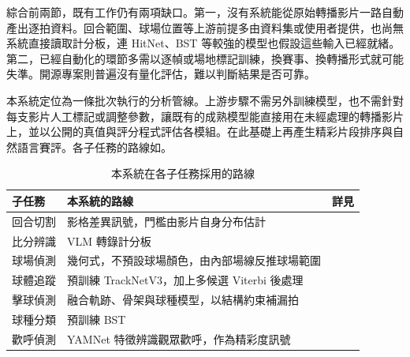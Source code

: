 綜合前兩節，既有工作仍有兩項缺口。第一，沒有系統能從原始轉播影片一路自動產出逐拍資料。回合範圍、球場位置等上游前提多由資料集或使用者提供，也尚無系統直接讀取計分板，連 HitNet、BST 等較強的模型也假設這些輸入已經就緒。第二，已經自動化的環節多需以逐幀或場地標記訓練，換賽事、換轉播形式就可能失準。開源專案則普遍沒有量化評估，難以判斷結果是否可靠。

本系統定位為一條批次執行的分析管線。上游步驟不需另外訓練模型，也不需針對每支影片人工標記或調整參數，讓既有的成熟模型能直接用在未經處理的轉播影片上，並以公開的真值與評分程式評估各模組。在此基礎上再產生精彩片段排序與自然語言賽評。各子任務的路線如。

\begin{table}[htbp]
  \centering
  \small
  \caption{本系統在各子任務採用的路線}
  \label{tab:positioning}
  \begin{tabularx}{\linewidth}{|l|L|r|}
    \hline
    {子任務} & {本系統的路線} & {詳見} \\ \hline
    回合切割 & 影格差異訊號，門檻由影片自身分布估計 &  \\ \hline
    比分辨識 & VLM 轉錄計分板 &  \\ \hline
    球場偵測 & 幾何式，不預設球場顏色，由內部場線反推球場範圍 &  \\ \hline
    球體追蹤 & 預訓練 TrackNetV3，加上多候選 Viterbi 後處理 &  \\ \hline
    擊球偵測 & 融合軌跡、骨架與球種模型，以結構約束補漏拍 &  \\ \hline
    球種分類 & 預訓練 BST &  \\ \hline
    歡呼偵測 & YAMNet 特徵辨識觀眾歡呼，作為精彩度訊號 &  \\ \hline
  \end{tabularx}
\end{table}
